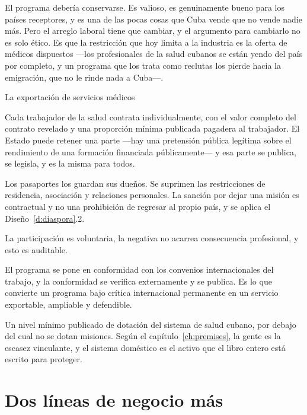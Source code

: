 El programa debería conservarse. Es valioso, es genuinamente bueno para los países
receptores, y es una de las pocas cosas que Cuba vende que no vende nadie más. Pero el arreglo
laboral tiene que cambiar, y el argumento para cambiarlo no es solo ético. Es que la
restricción que hoy limita a la industria es la oferta de médicos dispuestos ---los
profesionales de la salud cubanos se están yendo del país por completo, y un programa que los
trata como reclutas los pierde hacia la emigración, que no le rinde nada a Cuba---.

\begin{design}{La exportación de servicios médicos}
\label{d:missions}
\begin{rules}
 Cada trabajador de la salud contrata individualmente, con el
valor completo del contrato revelado y una proporción mínima publicada pagadera al trabajador.
El Estado puede retener una parte ---hay una pretensión pública legítima sobre el rendimiento
de una formación financiada públicamente--- y esa parte se publica, se legisla, y es la misma
para todos.

 Los pasaportes los guardan sus dueños.
Se suprimen las restricciones de residencia, asociación y relaciones personales. La sanción
por dejar una misión es contractual y no una prohibición de regresar al propio país, y se
aplica el Diseño~\ref{d:diaspora}.2.

 La participación es voluntaria, la negativa no acarrea consecuencia
profesional, y esto es auditable.

 El programa se pone en conformidad con los convenios
internacionales del trabajo, y la conformidad se verifica externamente y se publica. Es lo que
convierte un programa bajo crítica internacional permanente en un servicio exportable,
ampliable y defendible.

 Un nivel mínimo publicado de dotación del sistema de salud
cubano, por debajo del cual no se dotan misiones. Según el capítulo~\ref{ch:premises}, la
gente es la escasez vinculante, y el sistema doméstico es el activo que el libro entero está
escrito para proteger.
\end{rules}
\end{design}

\section{Dos líneas de negocio más}

